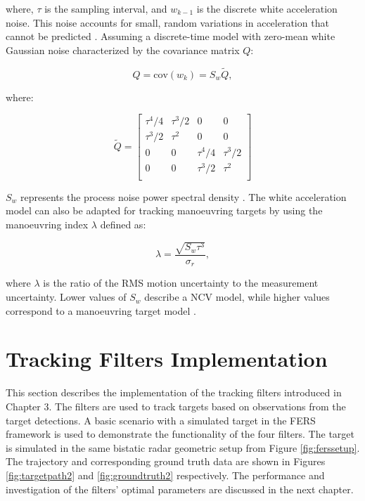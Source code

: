 where, \( \tau \) is the sampling interval, and \( w_{k-1} \) is the discrete white acceleration noise. This noise accounts for small, random variations in acceleration that cannot be predicted \cite{Li2003a}. Assuming a discrete-time model with zero-mean white Gaussian noise characterized by the covariance matrix \( Q \):

\begin{equation}
    Q = \text{cov}(w_k) = S_w \tilde{Q},
\end{equation}

where:

\begin{equation}
    \tilde{Q}  = \begin{bmatrix}
        \tau^4/4 & \tau^3/2 & 0 & 0 \\
        \tau^3/2 & \tau^2 & 0 & 0 \\
        0 & 0 & \tau^4/4 & \tau^3/2\\
        0 & 0 & \tau^3/2 & \tau^2\\
    \end{bmatrix}
    \label{Qmatrix}
\end{equation}

\( S_w \) represents the process noise power spectral density \cite{Measurements2023b}. The white acceleration model can also be adapted for tracking manoeuvring targets by using the manoeuvring index \( \lambda \) defined as:

\begin{equation}
    \lambda = \frac{\sqrt{S_w \tau^3}}{\sigma_r}, 
\end{equation}

where \( \lambda \) is the ratio of the \ac{RMS} motion uncertainty to the measurement uncertainty. Lower values of \( S_w \) describe a \ac{NCV} model, while higher values correspond to a manoeuvring target model \cite{953264}.


\section{Tracking Filters Implementation}

This section describes the implementation of the tracking filters introduced in Chapter 3. The filters are used to track targets based on observations from the target detections. A basic scenario with a simulated target in the FERS framework is used to demonstrate the functionality of the four filters. The target is simulated in the same bistatic radar geometric setup 
from Figure \ref{fig:ferssetup}. The trajectory and corresponding ground 
truth data are shown in Figures \ref{fig:targetpath2} and 
\ref{fig:groundtruth2} respectively. The performance and investigation of 
the filters' optimal parameters are discussed in the next chapter.

